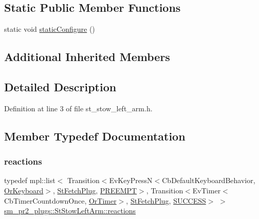 \subsection*{Static Public Member Functions}
\begin{DoxyCompactItemize}
\item 
static void \hyperlink{structsm__pr2__plugs_1_1StStowLeftArm_a3075009fd893f157279494836e4af96d}{static\+Configure} ()
\end{DoxyCompactItemize}
\subsection*{Additional Inherited Members}


\subsection{Detailed Description}


Definition at line 3 of file st\+\_\+stow\+\_\+left\+\_\+arm.\+h.



\subsection{Member Typedef Documentation}
\mbox{\label{structsm__pr2__plugs_1_1StStowLeftArm_a87f889e0a7e42c40fabfc6d4af5256f0}} 
\subsubsection{\texorpdfstring{reactions}{reactions}}
{\footnotesize\ttfamily typedef mpl\+::list$<$ Transition$<$Ev\+Key\+PressN$<$Cb\+Default\+Keyboard\+Behavior, \hyperlink{classsm__pr2__plugs_1_1OrKeyboard}{Or\+Keyboard}$>$, \hyperlink{structsm__pr2__plugs_1_1StFetchPlug}{St\+Fetch\+Plug}, \hyperlink{classPREEMPT}{P\+R\+E\+E\+M\+PT}$>$, Transition$<$Ev\+Timer$<$Cb\+Timer\+Countdown\+Once, \hyperlink{classsm__pr2__plugs_1_1OrTimer}{Or\+Timer}$>$, \hyperlink{structsm__pr2__plugs_1_1StFetchPlug}{St\+Fetch\+Plug}, \hyperlink{classSUCCESS}{S\+U\+C\+C\+E\+SS}$>$ $>$ \hyperlink{structsm__pr2__plugs_1_1StStowLeftArm_a87f889e0a7e42c40fabfc6d4af5256f0}{sm\+\_\+pr2\+\_\+plugs\+::\+St\+Stow\+Left\+Arm\+::reactions}}



